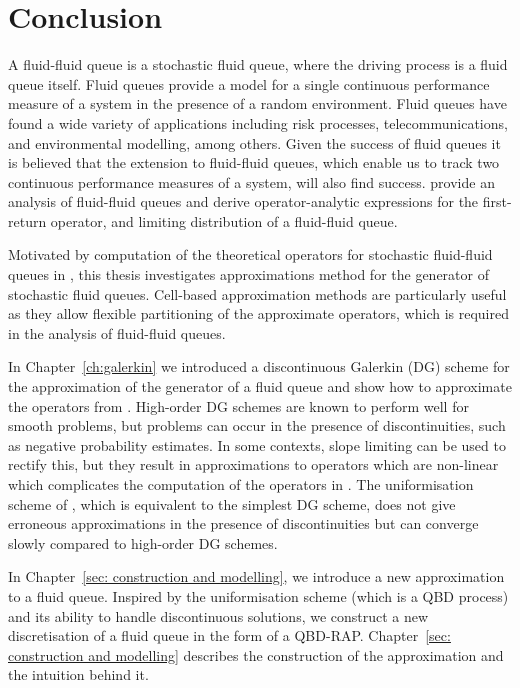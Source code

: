 \chapter{Conclusion\label{ch: conclusion}} 
A fluid-fluid queue is a stochastic fluid queue, where the driving process is a fluid queue itself. Fluid queues provide a model for a single continuous performance measure of a system in the presence of a random environment. Fluid queues have found a wide variety of applications including risk processes, telecommunications, and environmental modelling, among others. Given the success of fluid queues it is believed that the extension to fluid-fluid queues, which enable us to track two continuous performance measures of a system, will also find success. \cite{bo2014} provide an analysis of fluid-fluid queues and derive operator-analytic expressions for the first-return operator, and limiting distribution of a fluid-fluid queue.

Motivated by computation of the theoretical operators for stochastic fluid-fluid queues in \cite{bo2014}, this thesis investigates approximations method for the generator of stochastic fluid queues. Cell-based approximation methods are particularly useful as they allow flexible partitioning of the approximate operators, which is required in the analysis of fluid-fluid queues. 

In Chapter~\ref{ch:galerkin} we introduced a discontinuous Galerkin (DG) scheme for the approximation of the generator of a fluid queue and show how to approximate the operators from \cite{bo2014}. High-order DG schemes are known to perform well for smooth problems, but problems can occur in the presence of discontinuities, such as negative probability estimates. In some contexts, slope limiting can be used to rectify this, but they result in approximations to operators which are non-linear which complicates the computation of the operators in \cite{bo2014}. The uniformisation scheme of \cite{bo2013}, which is equivalent to the simplest DG scheme, does not give erroneous approximations in the presence of discontinuities but can converge slowly compared to high-order DG schemes. 

In Chapter~\ref{sec: construction and modelling}, we introduce a new approximation to a fluid queue. Inspired by the uniformisation scheme (which is a QBD process) and its ability to handle discontinuous solutions, we construct a new discretisation of a fluid queue in the form of a QBD-RAP. Chapter~\ref{sec: construction and modelling} describes the construction of the approximation and the intuition behind it. 

